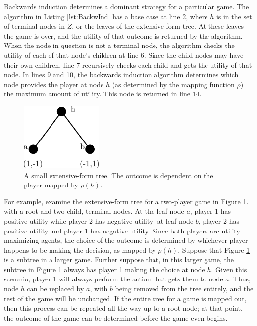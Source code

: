 Backwards induction determines a dominant strategy for a particular game. The algorithm in Listing \ref{lst:BackwInd} has a base case at line 2, where $h$ is in the set of terminal nodes in $Z$, or the leaves of the extensive-form tree. At these leaves the game is over, and the utility of that outcome is returned by the algorithm. When the node in question is not a terminal node, the algorithm checks the utility of each of that node's children at line 6. Since the child nodes may have their own children, line 7 recursively checks each child and gets the utility of that node. In lines 9 and 10, the backwards induction algorithm determines which node provides the player at node $h$ (as determined by the mapping function $\rho$) the maximum amount of utility. This node is returned in line 14.\\

\begin{figure}[H]
  \centering
  \includegraphics[width=4cm]{figures/ExampleBackwardInduction.png}
  \caption{A small extensive-form tree. The outcome is dependent on the player mapped by $\rho(h)$.}
  \label{fig:BackwardInduction}
\end{figure}

For example, examine the extensive-form tree for a two-player game in Figure \ref{fig:BackwardInduction}. with a root and two child, terminal nodes. At the leaf node $a$, player 1 has positive utility while player 2 has negative utility; at leaf node $b$, player 2 has positive utility and player 1 has negative utility. Since both players are utility-maximizing agents, the choice of the outcome is determined by whichever player happens to be making the decision, as mapped by $\rho(h)$. Suppose that Figure \ref{fig:BackwardInduction} is a subtree in a larger game. Further suppose that, in this larger game, the subtree in Figure \ref{fig:BackwardInduction} always has player 1 making the choice at node $h$. Given this scenario, player 1 will always perform the action that gets them to node $a$. Thus, node $h$ can be replaced by $a$, with $b$ being removed from the tree entirely, and the rest of the game will be unchanged. If the entire tree for a game is mapped out, then this process can be repeated all the way up to a root node; at that point, the outcome of the game can be determined before the game even begins.